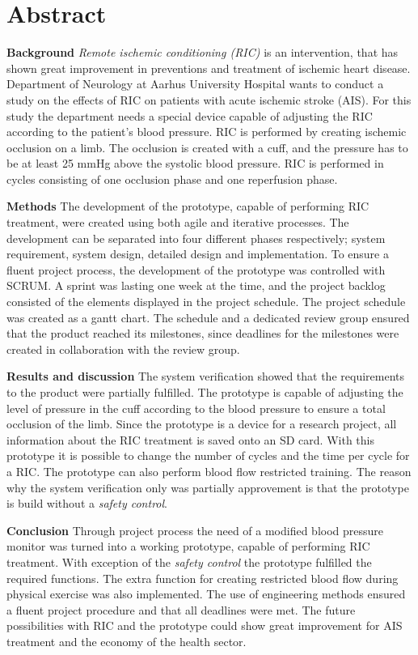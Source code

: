 \chapter*{Abstract}
\textbf{Background} \textit{Remote ischemic conditioning (RIC)} is an intervention, that has shown great improvement in preventions and treatment of ischemic heart disease. Department of Neurology at Aarhus University Hospital wants to conduct a study on the effects of RIC on patients with acute ischemic stroke (AIS). For this study the department needs a special device capable of adjusting the RIC according to the patient's blood pressure. RIC is performed by creating ischemic occlusion on a limb. The occlusion is created with a cuff, and the pressure has to be at least 25 mmHg above the systolic blood pressure. RIC is performed in cycles consisting of one occlusion phase and one reperfusion phase. 

\textbf{Methods} The development of the prototype, capable of performing RIC treatment, were created using both agile and iterative processes. The development can be separated into four different phases respectively; system requirement, system design, detailed design and implementation. To ensure a fluent project process, the development of the prototype was controlled with SCRUM. A sprint was lasting one week at the time, and the project backlog consisted of the elements displayed in the project schedule. The project schedule was created as a gantt chart. The schedule and a dedicated review group ensured that the product reached its milestones, since deadlines for the milestones were created in collaboration with the review group. 

\textbf{Results and discussion} The system verification showed that the requirements to the product were partially fulfilled. The prototype is capable of adjusting the level of pressure in the cuff according to the blood pressure to ensure a total occlusion of the limb. Since the prototype is a device for a research project, all information about the RIC treatment is saved onto an SD card. With this prototype it is possible to change the number of cycles and the time per cycle for a RIC. The prototype can also perform blood flow restricted training. The reason why the system verification only was partially approvement is that the prototype is build without a \textit{safety control}. 

\textbf{Conclusion}
Through project process the need of a modified blood pressure monitor was turned into a working prototype, capable of performing RIC treatment. With exception of the \textit{safety control} the prototype fulfilled the required functions. The extra function for creating restricted blood flow during physical exercise was also implemented. The use of engineering methods ensured a fluent project procedure and that all deadlines were met. The future possibilities with RIC and the prototype could show great improvement for AIS treatment and the economy of the health sector. 
